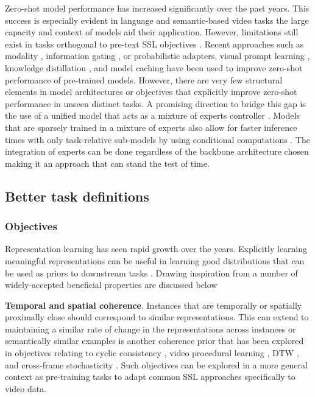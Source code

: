 Zero-shot model performance has increased significantly over the past years. This success is especially evident in language and semantic-based video tasks the large capacity and context of models aid their application. However, limitations still exist in tasks orthogonal to pre-text SSL objectives \citep{liu2024mmbench}. Recent approaches such as modality \citep{lin2023vision,sung2022vl}, information gating \citep{zhang2024llama}, or probabilistic \citep{upadhyay2023probvlm} adapters, visual prompt learning \citep{khattak2023maple}, knowledge distillation \citep{mistretta2024improving}, and model caching \citep{zhang2021tip} have been used to improve zero-shot performance of pre-trained models. However, there are very few structural elements in model architectures or objectives that explicitly improve zero-shot performance in unseen distinct tasks. A promising direction to bridge this gap is the use of a unified model that acts as a mixture of experts controller  \citep{bao2022vlmo,lin2024moe,wang2022image,yu2024boosting}. Models that are sparsely trained in a mixture of experts also allow for faster inference times with only task-relative sub-models by using conditional computations \citep{bengio2013estimating,jacobs1991adaptive}. The integration of experts can be done regardless of the backbone architecture chosen making it an approach that can stand the test of time.


\subsection{Better task definitions}
\label{sec:outlook::tasks}

\subsubsection{Objectives}

Representation learning has seen rapid growth over the years. Explicitly learning meaningful representations can be useful in learning good distributions that can be used as priors to downstream tasks \citep{bengio2013representation,janocha2017loss,larochelle2009exploring}. Drawing inspiration from \citep{bengio2013representation} a number of widely-accepted beneficial properties are discussed below

\noindent
\textbf{Temporal and spatial coherence}. Instances that are temporally or spatially proximally close should correspond to similar representations. This can extend to maintaining a similar rate of change in the representations across instances or semantically similar examples is another coherence prior that has been explored in objectives relating to cyclic consistency \citep{dwibedi2018temporal,donahue2024learning,haresh2021learning}, video procedural learning \citep{chen2022frame,sermanet2018time}, DTW \citep{dvornik2021drop,hadji2021representation}, and cross-frame stochasticity \citep{zhang2023modeling}. Such objectives can be explored in a more general context as pre-training tasks to adapt common SSL approaches specifically to video data. 


